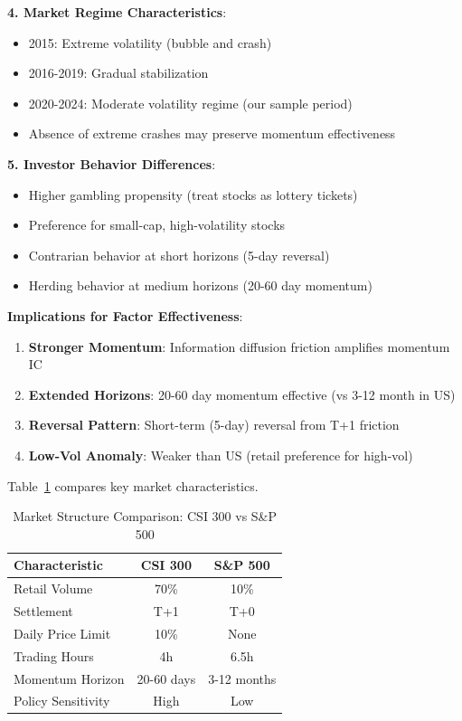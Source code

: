 \textbf{4. Market Regime Characteristics}:
\begin{itemize}
    \item 2015: Extreme volatility (bubble and crash)
    \item 2016-2019: Gradual stabilization
    \item 2020-2024: Moderate volatility regime (our sample period)
    \item Absence of extreme crashes may preserve momentum effectiveness
\end{itemize}

\textbf{5. Investor Behavior Differences}:
\begin{itemize}
    \item Higher gambling propensity (treat stocks as lottery tickets)
    \item Preference for small-cap, high-volatility stocks
    \item Contrarian behavior at short horizons (5-day reversal)
    \item Herding behavior at medium horizons (20-60 day momentum)
\end{itemize}

\textbf{Implications for Factor Effectiveness}:
\begin{enumerate}
    \item \textbf{Stronger Momentum}: Information diffusion friction amplifies momentum IC
    \item \textbf{Extended Horizons}: 20-60 day momentum effective (vs 3-12 month in US)
    \item \textbf{Reversal Pattern}: Short-term (5-day) reversal from T+1 friction
    \item \textbf{Low-Vol Anomaly}: Weaker than US (retail preference for high-vol)
\end{enumerate}

Table~\ref{tab:market_comparison} compares key market characteristics.

\begin{table}[h]
\centering
\caption{Market Structure Comparison: CSI 300 vs S\&P 500}
\label{tab:market_comparison}
\begin{tabular}{lcc}
\toprule
Characteristic & CSI 300 & S\&P 500 \\
\midrule
Retail Volume & 70\% & 10\% \\
Settlement & T+1 & T+0 \\
Daily Price Limit & 10\% & None \\
Trading Hours & 4h & 6.5h \\
Momentum Horizon & 20-60 days & 3-12 months \\
Policy Sensitivity & High & Low \\
\bottomrule
\end{tabular}
\end{table}

